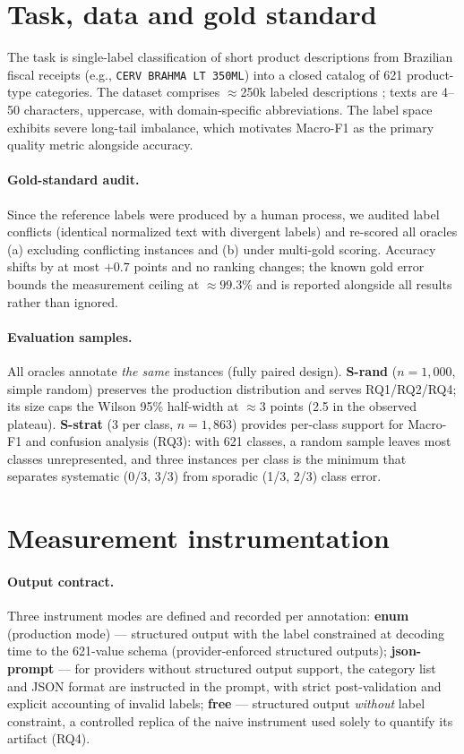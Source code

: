 \documentclass[11pt]{article}
\begin{document}
\section{Task, data and gold standard}
\label{sec:data}

The task is single-label classification of short product descriptions from
Brazilian fiscal receipts (e.g., \texttt{CERV BRAHMA LT 350ML}) into a
closed catalog of 621 product-type categories. The dataset comprises
$\approx$250k labeled descriptions \citep{Daru2024Dissertacao}; texts are
4--50 characters, uppercase, with domain-specific abbreviations. The label
space exhibits severe long-tail imbalance, which motivates Macro-F1 as the
primary quality metric alongside accuracy.

\paragraph{Gold-standard audit.} Since the reference labels were produced
by a human process, we audited label conflicts (identical normalized text
with divergent labels) and re-scored all oracles (a) excluding conflicting
instances and (b) under multi-gold scoring. Accuracy shifts by at most
$+0.7$ points and no ranking changes; the known gold error bounds the
measurement ceiling at $\approx 99.3\%$ and is reported alongside all
results rather than ignored.

\paragraph{Evaluation samples.} All oracles annotate \emph{the same}
instances (fully paired design). \textbf{S-rand} ($n=1{,}000$, simple
random) preserves the production distribution and serves RQ1/RQ2/RQ4; its
size caps the Wilson 95\% half-width at $\approx 3$ points (2.5 in the
observed plateau). \textbf{S-strat} (3 per class, $n=1{,}863$) provides
per-class support for Macro-F1 and confusion analysis (RQ3): with 621
classes, a random sample leaves most classes unrepresented, and three
instances per class is the minimum that separates systematic (0/3, 3/3)
from sporadic (1/3, 2/3) class error.

\section{Measurement instrumentation}
\label{sec:instrument}

\paragraph{Output contract.} Three instrument modes are defined and
recorded per annotation: \textbf{enum} (production mode) --- structured
output with the label constrained at decoding time to the 621-value schema
(provider-enforced structured outputs); \textbf{json-prompt} --- for
providers without structured output support, the category list and JSON
format are instructed in the prompt, with strict post-validation and
explicit accounting of invalid labels; \textbf{free} --- structured output
\emph{without} label constraint, a controlled replica of the naive
instrument used solely to quantify its artifact (RQ4).
\end{document}

